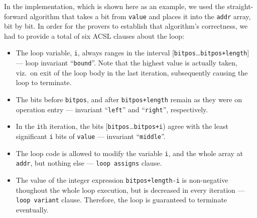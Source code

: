 In the implementation, which is shown here as an example, we used
the straight-forward
algorithm that takes a bit from \lstinline{value} and places it into
the \lstinline{addr} array, bit by bit.
%
In order for the provers to establish that algorithm's correctness,
we had to provide a total of six ACSL clauses about the loop:
%
\begin{itemize}
\item The loop variable, \lstinline{i}, always ranges in the interval
	[\lstinline{bitpos}\ldots\lstinline{bitpos+length}] 
	--- loop invariant ``\lstinline{bound}''.
	Note that the highest value is actually taken,
	viz.\ on exit of the loop body in the last iteration,
	subsequently causing the loop to terminate.
\item The bits before \lstinline{bitpos}, and after
	\lstinline{bitpos+length}
	remain as they were on operation entry --- invariant
	``\lstinline{left}'' and ``\lstinline{right}'', respectively.
\item In the \lstinline{i}th iteration, the bits
	[\lstinline{bitpos}\ldots\lstinline{bitpos+i}) agree with
	the least significant
	\lstinline{i} bits of \lstinline{value} --- invariant
	``\lstinline{middle}''.
\item The loop code is allowed to modify the variable \lstinline{i},
	and the whole array
	at \lstinline{addr}, but nothing else --- 
	\lstinline{loop assigns} clause.
\item The value of the integer
	expression \lstinline{bitpos+length-i} is non-negative thoughout
	the whole loop execution, but is decreased in every iteration 
	--- \lstinline{loop variant} clause.
	Therefore, the loop is guaranteed to terminate eventually.
\end{itemize}









